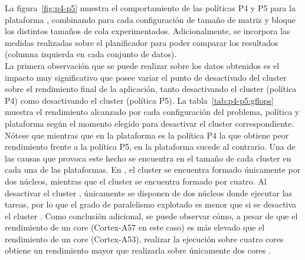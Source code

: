 \begin{table}

\end{table}


La figura~\ref{fig:p4-p5} muestra el comportamiento de las políticas P4 y
P5 para la plataforma \juno, combinando para cada configuración de tamaño
de matriz y bloque los distintos tamaños de cola experimentados. 
Adicionalmente, se incorpora las medidas realizadas sobre el planificador
\botlev para poder comparar los resultados (columna izquierda en cada
conjunto de datos).\\

La primera observación que se puede realizar sobre los datos obtenidos es
el impacto muy significativo que posee variar el punto de desactivado del
cluster sobre el rendimiento final de la aplicación, tanto desactivando el
cluster \LITTLE (política P4) como desactivando el cluster \BIG (política
P5). La tabla~\ref{tab:p4-p5:gflops} muestra el rendimiento alcanzado por
cada configuración del problema, política y plataforma según el momento
elegido para desactivar el cluster correspondiente. Nótese que mientras que
en la plataforma \juno es la política P4 la que obtiene peor rendimiento
frente a la política P5, en la plataforma \odroid sucede al contrario. Una
de las causas que provoca este hecho se encuentra en el tamaño de cada
cluster en cada una de las plataformas. En \juno, el cluster \BIG se
encuentra formado únicamente por dos núcleos, mientras que el cluster
\LITTLE se encuentra formado por cuatro. Al desactivar el cluster \LITTLE,
únicamente se disponen de dos núcleos donde ejecutar las tareas, por lo que
el grado de paralelismo explotado es menor que si se desactiva el cluster
\BIG. Como conclusión adicional, se puede observar cómo, a pesar de que el
rendimiento de un core \BIG (Cortex-A57 en este caso) es más elevado que el
rendimiento de un core \LITTLE (\mbox{Cortex-A53}), realizar la ejecución sobre
cuatro cores \LITTLE obtiene un rendimiento mayor que realizarla sobre
únicamente dos cores \BIG.\\


